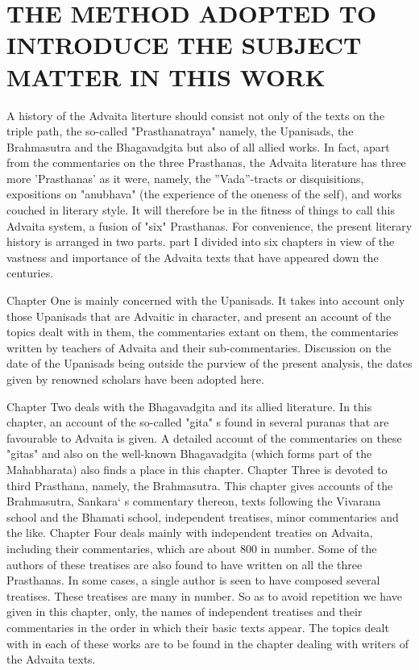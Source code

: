 \section{THE METHOD ADOPTED TO INTRODUCE THE SUBJECT MATTER IN THIS WORK}
A history of the Advaita literture should consist not only of the texts on the triple path, the so-called "Prasthanatraya" namely, the Upanisads, the Brahmasutra and the Bhagavadgita but also of all allied works. In fact, apart from the commentaries on the three Prasthanas, the Advaita literature has three more 'Prasthanas' as it were, namely, the ''Vada''-tracts or disquisitions, expositions on "anubhava" (the experience of the oneness of the self), and works couched in literary style. It will therefore be in the fitness of things to call this Advaita system, a fusion of "six" Prasthanas. For convenience, the present literary history is arranged in two parts. part I divided into six chapters in view of the vastness and importance of the Advaita texts that have appeared down the centuries. 

Chapter One is mainly concerned with the Upanisads. It takes into account only those Upanisads that are Advaitic in character, and present an account of the topics dealt with in them, the commentaries extant on them, the commentaries written by teachers of Advaita and their sub-commentaries. Discussion on the date of the Upanisads being outside the purview of the present analysis, the dates given by renowned scholars have been adopted here. 

Chapter Two deals with the Bhagavadgita and its allied literature. In this chapter, an account of the so-called "gita" s found in several puranas that are favourable to Advaita is given. A detailed account of the commentaries on these "gitas" and also on the well-known Bhagavadgita (which forms part of the Mahabharata) also finds a place in this chapter. 
Chapter Three is devoted to third Prasthana, namely, the Brahmasutra. This chapter gives accounts of the Brahmasutra, Sankara` s commentary thereon, texts following the Vivarana school and the Bhamati school, independent treatises, minor commentaries and the like.
Chapter Four deals mainly with independent treaties on Advaita, including their commentaries, which are about 800 in number. Some of the authors of these treatises are also found to have written on all the three Prasthanas. In some cases, a single author is seen to have composed several treatises. These treatises are many in number. So as to avoid repetition we have given in this chapter, only, the names of independent treatises and their commentaries in the order in which their basic texts appear. The topics dealt with in each of these works are to be found in the chapter dealing with writers of the Advaita texts. 

